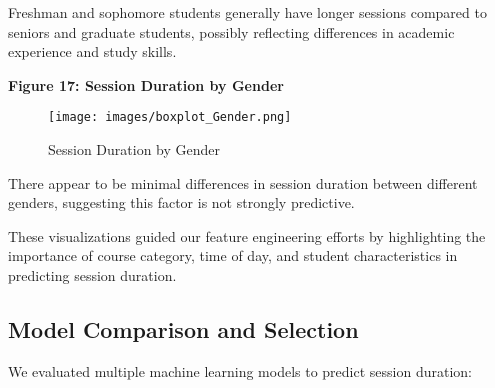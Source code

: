 \documentclass[12pt,letterpaper]{article}
\begin{document}
Freshman and sophomore students generally have longer sessions compared to seniors and graduate students, possibly reflecting differences in academic experience and study skills.

\textbf{Figure 17: Session Duration by Gender}

\begin{figure}[H]
    \centering
    \texttt{[image: images/boxplot\_Gender.png]}
    \caption{Session Duration by Gender}
\end{figure}

There appear to be minimal differences in session duration between different genders, suggesting this factor is not strongly predictive.

These visualizations guided our feature engineering efforts by highlighting the importance of course category, time of day, and student characteristics in predicting session duration.

\subsection{Model Comparison and Selection}

We evaluated multiple machine learning models to predict session duration:
\end{document}
